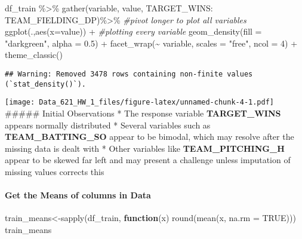 \documentclass[
]{article}
\newenvironment{Shaded}{\begin{snugshade}}{\end{snugshade}}
\newcommand{\AttributeTok}[1]{\textcolor[rgb]{0.77,0.63,0.00}{#1}}
\newcommand{\CommentTok}[1]{\textcolor[rgb]{0.56,0.35,0.01}{\textit{#1}}}
\newcommand{\ConstantTok}[1]{\textcolor[rgb]{0.00,0.00,0.00}{#1}}
\newcommand{\ControlFlowTok}[1]{\textcolor[rgb]{0.13,0.29,0.53}{\textbf{#1}}}
\newcommand{\DecValTok}[1]{\textcolor[rgb]{0.00,0.00,0.81}{#1}}
\newcommand{\FloatTok}[1]{\textcolor[rgb]{0.00,0.00,0.81}{#1}}
\newcommand{\FunctionTok}[1]{\textcolor[rgb]{0.00,0.00,0.00}{#1}}
\newcommand{\NormalTok}[1]{#1}
\newcommand{\OtherTok}[1]{\textcolor[rgb]{0.56,0.35,0.01}{#1}}
\newcommand{\SpecialCharTok}[1]{\textcolor[rgb]{0.00,0.00,0.00}{#1}}
\newcommand{\StringTok}[1]{\textcolor[rgb]{0.31,0.60,0.02}{#1}}
\begin{document}
\begin{Shaded}
\begin{Highlighting}[]
\NormalTok{df\_train }\SpecialCharTok{\%\textgreater{}\%} 
  \FunctionTok{gather}\NormalTok{(variable, value, TARGET\_WINS}\SpecialCharTok{:}\NormalTok{ TEAM\_FIELDING\_DP)}\SpecialCharTok{\%\textgreater{}\%} \CommentTok{\#pivot longer to plot all variables}
  \FunctionTok{ggplot}\NormalTok{(.,}\FunctionTok{aes}\NormalTok{(}\AttributeTok{x=}\NormalTok{value)) }\SpecialCharTok{+} \CommentTok{\#plotting every variable}
  \FunctionTok{geom\_density}\NormalTok{(}\AttributeTok{fill =} \StringTok{"darkgreen"}\NormalTok{, }\AttributeTok{alpha =} \FloatTok{0.5}\NormalTok{) }\SpecialCharTok{+}
  \FunctionTok{facet\_wrap}\NormalTok{(}\SpecialCharTok{\textasciitilde{}}\NormalTok{ variable, }\AttributeTok{scales =} \StringTok{"free"}\NormalTok{, }\AttributeTok{ncol =} \DecValTok{4}\NormalTok{) }\SpecialCharTok{+}
  \FunctionTok{theme\_classic}\NormalTok{()}
\end{Highlighting}
\end{Shaded}

\begin{verbatim}
## Warning: Removed 3478 rows containing non-finite values (`stat_density()`).
\end{verbatim}

\texttt{[image: Data\_621\_HW\_1\_files/figure-latex/unnamed-chunk-4-1.pdf]}
\#\#\#\#\# Initial Observations * The response variable
\textbf{TARGET\_WINS} appears normally distributed * Several variables
such as \textbf{TEAM\_BATTING\_SO} appear to be bimodal, which may
resolve after the missing data is dealt with * Other variables like
\textbf{TEAM\_PITCHING\_H} appear to be skewed far left and may present
a challenge unless imputation of missing values corrects this

\hypertarget{get-the-means-of-columns-in-data}{%
\paragraph{\texorpdfstring{\textbf{Get the Means of columns in
Data}}{Get the Means of columns in Data}}\label{get-the-means-of-columns-in-data}}

\begin{Shaded}
\begin{Highlighting}[]
\NormalTok{train\_means}\OtherTok{\textless{}{-}}\FunctionTok{sapply}\NormalTok{(df\_train, }\ControlFlowTok{function}\NormalTok{(x) }\FunctionTok{round}\NormalTok{(}\FunctionTok{mean}\NormalTok{(x, }\AttributeTok{na.rm =} \ConstantTok{TRUE}\NormalTok{)))}
\NormalTok{train\_means}
\end{Highlighting}
\end{Shaded}
\end{document}
